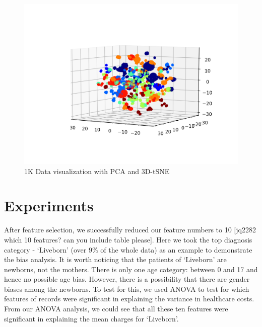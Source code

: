 \documentclass[10pt,twocolumn,letterpaper]{article}
\begin{document}
\begin{figure}
\includegraphics[scale=0.5]{1k-tsne.png}
\caption{1K Data visualization with PCA and 3D-tSNE}
\end{figure}


\section{Experiments}

After feature selection, we successfully reduced our feature numbers to 10 [jq2282 which 10 features? can you include table please]. Here we took the top diagnosis category - `Liveborn' (over 9\% of the whole data) as an example to demonstrate the bias analysis. It is worth noticing that the patients of `Liveborn' are newborns, not the mothers. There is only one age category: between 0 and 17 and hence no possible age bias. However, there is a possibility that there are gender biases among the newborns. To test for this, we used ANOVA to test for which features of records were significant in explaining the variance in healthcare costs. From our ANOVA analysis, we could see that all these ten features were significant in explaining the mean charges for `Liveborn'.
\end{document}
